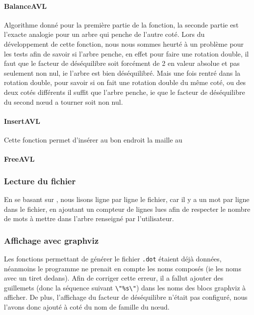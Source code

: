 \documentclass{article} %
\begin{document}
\paragraph{BalanceAVL} Algorithme donné pour la première partie de la fonction, la seconde partie est l'exacte analogie pour un arbre qui penche de l'autre coté. Lors du développement de cette fonction, nous nous sommes heurté à un problème pour les tests afin de savoir si l'arbre penche, en effet pour faire une rotation double, il faut que le facteur de déséquilibre soit forcément de 2 en valeur absolue et pas seulement non nul, ie l'arbre est bien déséquilibré. Mais une fois rentré dans la rotation double, pour savoir si on fait une rotation double du même coté, ou des deux cotés différents il suffit que l'arbre penche, ie que le facteur de déséquilibre du second nœud a tourner soit non nul. 

\paragraph{InsertAVL} Cette fonction permet d'insérer au bon endroit la maille au 

\paragraph{FreeAVL}

\subsubsection{Lecture du fichier}
En se basant sur \cite{lect_lines}, nous lisons ligne par ligne le fichier, car il y a un mot par ligne dans le fichier, en ajoutant un compteur de lignes lues afin de respecter le nombre de mots à mettre dans l'arbre renseigné par l'utilisateur.  

\subsubsection{Affichage avec graphviz}
Les fonctions permettant de générer le fichier \texttt{.dot} étaient déjà données, néanmoins le programme ne prenait en compte les noms composés (ie les noms avec un tiret dedans). Afin de corriger cette erreur, il a fallut ajouter des guillemets (donc la séquence suivant \texttt{\textbackslash "\%s\textbackslash "}) dans les noms des blocs graphviz à afficher. De plus, l'affichage du facteur de déséquilibre n'était pas configuré, nous l'avons donc ajouté à coté du nom de famille du nœud.
\end{document}
